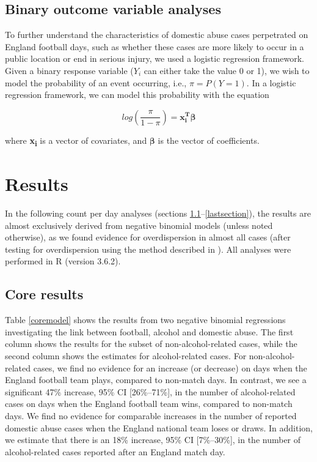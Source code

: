 \documentclass[12pt, a4paper]{article}
\newcommand{\vect}[1]{\boldsymbol{#1}}
\begin{document}
\subsection{Binary outcome variable analyses}

To further understand the characteristics of domestic abuse cases perpetrated on England football days, such as whether these cases are more likely to occur in a public location or end in serious injury, we used a logistic regression framework. 
Given a binary response variable ($Y_{i}$ can either take the value 0 or 1), we wish to model the probability of an event occurring, i.e., $\pi = P(Y = 1)$. 
In a logistic regression framework, we can model this probability with the equation

\begin{equation}
log(\frac{\pi}{1-\pi})= \vect{x_i^{T}}\vect{\beta}
\end{equation}

where \textbf{x\textsubscript{i}} is a vector of covariates, and $\boldsymbol{\beta}$ is the vector of coefficients.


\newpage

\section{Results}

In the following count per day analyses (sections \ref{firstsection}--\ref{lastsection}), the results are almost exclusively derived from negative binomial models (unless noted otherwise), as we found evidence for overdispersion in almost all cases (after testing for overdispersion using the method described in ). All analyses were performed in R (version 3.6.2).


\subsection{Core results} \label{firstsection}

Table \ref{coremodel} shows the results from two negative binomial regressions investigating the link between football, alcohol and domestic abuse. The first column shows the results for the subset of non-alcohol-related cases, while the second column shows the estimates for alcohol-related cases. For non-alcohol-related cases, we find no evidence for an increase (or decrease) on days when the England football team plays, compared to non-match days. In contrast, we see a significant 47\% increase, 95\% CI [26\%--71\%], in the number of alcohol-related cases on days when the England football team wins, compared to non-match days. We find no evidence for comparable increases in the number of reported domestic abuse cases when the England national team loses or draws. In addition, we estimate that there is an 18\% increase, 95\% CI [7\%--30\%], in the number of alcohol-related cases reported after an England match day. 
\end{document}
